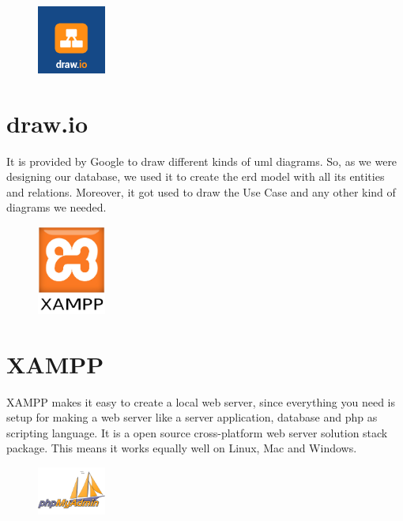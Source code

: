 \begin{figure}
  \begin{center}
    \includegraphics[width=0.2\textwidth] {bilder/Draw_io}
  \end{center}
\end{figure}
\section{draw.io}
It is provided by Google to draw different kinds of \gls{uml} diagrams. So, as we were designing our database, we used it to create the \gls{erd} model with all its entities and relations. Moreover, it got used to draw the Use Case and any other kind of diagrams we needed.

\begin{figure}
  \begin{center}
    \includegraphics[width=0.2\textwidth] {bilder/XAMPP}
  \end{center}
\end{figure}
\section{XAMPP}
XAMPP makes it easy to create a local web server, since everything you need is setup for making a web server like a server application, database and \gls{php} as scripting language. It is a open source cross-platform web server solution stack package. This means it works equally well on Linux, Mac and Windows.

\begin{figure}
  \begin{center}
    \includegraphics[width=0.2\textwidth] {bilder/phpMyAdmin}
  \end{center}
\end{figure}
